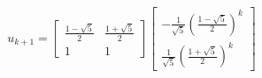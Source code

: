 \documentclass[preview]{standalone}
\begin{document}
\begin{center}
$$u_{k + 1} = \begin{bmatrix} \frac{1 - \sqrt{5}}{2} & \frac{1 + \sqrt{5}}{2} \\ 1 & 1 \end{bmatrix} \begin{bmatrix} - \frac{1}{\sqrt{5}} \left(\frac{1 - \sqrt{5}}{2}\right)^k \\ \frac{1}{\sqrt{5}} \left(\frac{1 + \sqrt{5}}{2}\right)^k \end{bmatrix}$$
\end{center}
\end{document}
